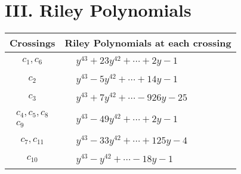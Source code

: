 \documentclass[1p]{elsarticle_modified}
\theoremstyle{definition}
\begin{document}
\centering \section*{ III. Riley Polynomials}
\begin{tabular}{m{50pt}|m{274pt}}
Crossings & \hspace{64pt}Riley Polynomials at each crossing \\
\hline $$\begin{aligned}c_{1},c_{6}\end{aligned}$$&$\begin{aligned}
&y^{43}+23 y^{42}+\cdots+2 y-1
\end{aligned}$\\
\hline $$\begin{aligned}c_{2}\end{aligned}$$&$\begin{aligned}
&y^{43}-5 y^{42}+\cdots+14 y-1
\end{aligned}$\\
\hline $$\begin{aligned}c_{3}\end{aligned}$$&$\begin{aligned}
&y^{43}+7 y^{42}+\cdots-926 y-25
\end{aligned}$\\
\hline $$\begin{aligned}c_{4},c_{5},c_{8}\\c_{9}\end{aligned}$$&$\begin{aligned}
&y^{43}-49 y^{42}+\cdots+2 y-1
\end{aligned}$\\
\hline $$\begin{aligned}c_{7},c_{11}\end{aligned}$$&$\begin{aligned}
&y^{43}-33 y^{42}+\cdots+125 y-4
\end{aligned}$\\
\hline $$\begin{aligned}c_{10}\end{aligned}$$&$\begin{aligned}
&y^{43}- y^{42}+\cdots-18 y-1
\end{aligned}$\\
\hline
\end{tabular}
\vskip 2pc
\end{document}
